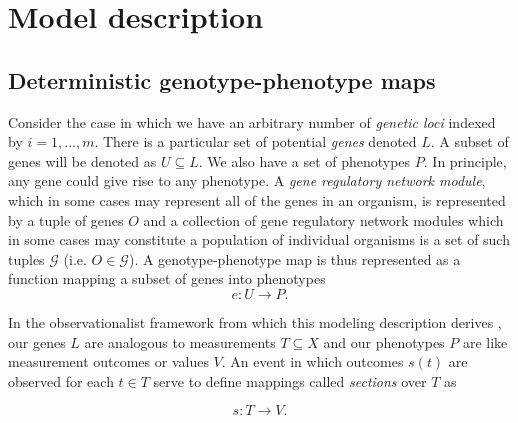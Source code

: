 \section*{Model description}

\subsection*{Deterministic genotype-phenotype maps}
Consider the case in which we have an arbitrary number of \emph{genetic loci} indexed by $i=1, \ldots, m$. There is a particular set of potential \emph{genes} denoted $L$. A subset of genes will be denoted as $U \subseteq L$. We also have a set of phenotypes $P$. In principle, any gene could give rise to any phenotype. A \emph{gene regulatory network module}, which in some cases may represent all of the genes in an organism, is represented by a tuple of genes $O$ and a collection of gene regulatory network modules which in some cases may constitute a population of individual organisms is a set of such tuples $\mathcal{G}$ (i.e. $O \in \mathcal{G}$). A genotype-phenotype map is thus represented as a function mapping a subset of genes into phenotypes
$$
e \colon U \rightarrow  P.
$$

In the observationalist framework from which this modeling description derives \cite{Abramsky2011}, our genes $L$ are analogous to measurements $T \subseteq X$ and our phenotypes $P$ are like measurement outcomes or values $V$. An event in which outcomes $s(t)$ are observed for each $t \in T$ serve to define mappings called \emph{sections} over $T$ as

$$
s \colon T \rightarrow V.
$$

